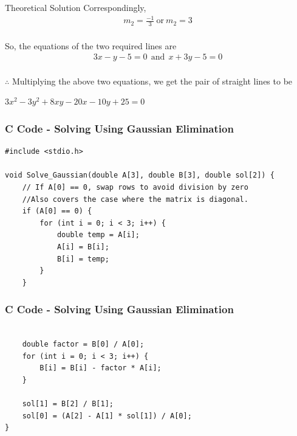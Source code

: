 \documentclass{beamer}
\begin{document}
\begin{frame}{Theoretical Solution}
Correspondingly,
\begin{align}
    m_2 = \frac{-1}{3} \ \text{or} \ m_2 = 3
\end{align}\\

So, the equations of the two required lines are
\begin{align}
    3x-y-5=0 \ \ \text{and}\ \ x+3y-5=0
\end{align}\\

$\therefore$ Multiplying the above two equations, we get the pair of straight lines to be 
\begin{center}
   $3x^2 - 3y^2 + 8xy - 20x - 10y + 25 = 0$
\end{center} 
\end{frame}

\begin{frame}[fragile]
    \frametitle{C Code - Solving Using Gaussian Elimination}

    \begin{lstlisting}
#include <stdio.h>

void Solve_Gaussian(double A[3], double B[3], double sol[2]) {
    // If A[0] == 0, swap rows to avoid division by zero
    //Also covers the case where the matrix is diagonal.
    if (A[0] == 0) {
        for (int i = 0; i < 3; i++) {
            double temp = A[i];
            A[i] = B[i];
            B[i] = temp;
        }
    }

    \end{lstlisting}

\end{frame}

\begin{frame}[fragile]
    \frametitle{C Code - Solving Using Gaussian Elimination}

    \begin{lstlisting}
    
    double factor = B[0] / A[0];
    for (int i = 0; i < 3; i++) {
        B[i] = B[i] - factor * A[i];
    }

    sol[1] = B[2] / B[1];
    sol[0] = (A[2] - A[1] * sol[1]) / A[0];
}

    \end{lstlisting}

\end{frame}
\end{document}
